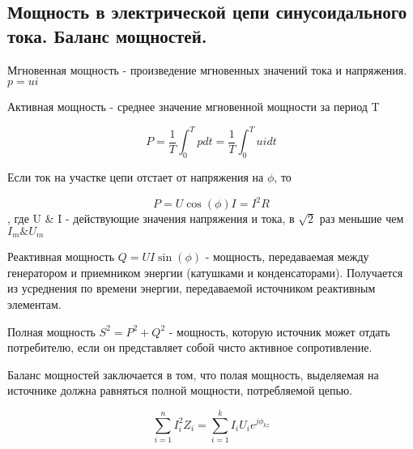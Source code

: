\subsection{Мощность в электрической цепи синусоидального тока. Баланс мощностей.}

Мгновенная мощность - произведение мгновенных значений тока и напряжения.
$p=u i$

Активная мощность - среднее значение мгновенной мощности за период T

\begin{equation}
P=\frac{1}{T} \int_0^T pdt = \frac{1}{T} \int_0^T uidt
\end{equation}

Если ток на участке цепи отстает от напряжения на $\phi$, то

\begin{equation}
P = U \cos (\phi) I = I^2 R
\end{equation}
, где U \& I - действующие значения напряжения и тока, в $\sqrt{2}$ раз меньшие чем $I_m \& U_m$

Реактивная мощность $Q = U I \sin(\phi)$ - мощность, передаваемая между генератором и приемником энергии (катушками и конденсаторами). Получается из усреднения по времени энергии, передаваемой источником реактивным элементам.

Полная мощность $S^2 = P^2 + Q^2$ - мощность, которую источник может отдать потребителю, если он представляет собой чисто активное сопротивление.


Баланс мощностей заключается в том, что полая мощность, выделяемая на источнике должна равняться полной мощности, потребляемой цепью.

\begin{equation}
\sum_{i=1}^n I_i^2 Z_i = \sum_{i=1}^k I_i U_i e^{j \phi_{kz}}
\end{equation} 


\pagebreak